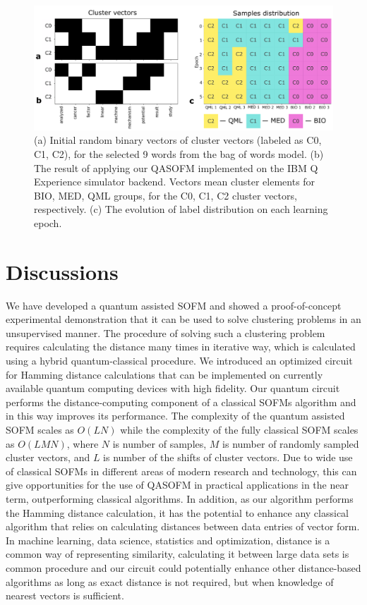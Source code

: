 \documentclass[pra,showkeys,twocolumn,showpacs]{revtex4-1}
\begin{document}
\begin{figure}[t]
	\includegraphics[width=0.95\columnwidth]{convergence.png}
	\caption{
		(a) Initial random binary vectors of cluster vectors (labeled as C0, C1, C2),
		for the selected 9 words from the bag of words model.
		(b) The result of applying our QASOFM implemented on the IBM Q Experience simulator backend.
		Vectors mean cluster elements for BIO, MED, QML groups,
		for the C0, C1, C2 cluster vectors, respectively.
		(c) The evolution of label distribution on each learning epoch.
	}
	\label{convergence}
\end{figure}



\section{Discussions}
We have developed a quantum assisted SOFM and showed a proof-of-concept experimental demonstration
that it can be used to solve clustering problems in an unsupervised manner.
The procedure of solving such a clustering problem requires calculating the distance many times in iterative way,
which is calculated using a hybrid quantum-classical procedure.
We introduced an optimized circuit for Hamming distance calculations that can be implemented on currently available quantum computing devices with high fidelity.
Our quantum circuit performs the distance-computing component of a classical SOFMs algorithm
and in this way improves its performance.
The complexity of the quantum assisted SOFM scales as $O(LN)$
while the complexity of the fully classical SOFM scales as $O(LMN)$,
where $N$ is number of samples, $M$ is number of randomly sampled cluster vectors,
and $L$ is number of the shifts of cluster vectors.
Due to wide use of classical SOFMs in different areas of modern research and technology,
this can give opportunities for the use of QASOFM in practical applications in the near term, outperforming classical algorithms.
In addition, as our algorithm performs the Hamming distance calculation,
it has the potential to enhance any classical algorithm that relies on calculating distances between data entries of vector form.
In machine learning, data science, statistics and optimization, distance is a common way of representing similarity, calculating it between large data sets is common procedure
and our circuit could potentially enhance other distance-based algorithms as long as exact distance is not required,
but when knowledge of nearest vectors is sufficient.
\end{document}
